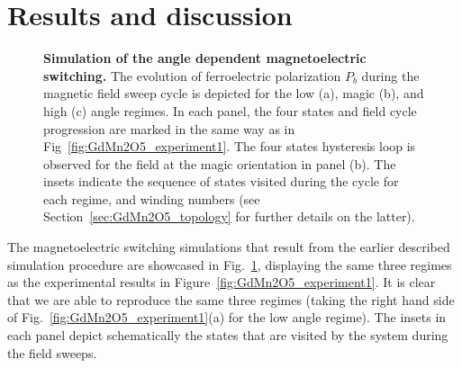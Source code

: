 \section{Results and discussion \label{sec:GdMn2O5_results_discussion}}
\begin{figure}
    \caption{\label{fig:GdMn2O5_theory}{\bf Simulation of the angle dependent magnetoelectric switching.}
    The evolution of ferroelectric polarization $P_b$ during the magnetic field sweep cycle is depicted for the low (a), magic (b), and high (c) angle regimes. 
   In each panel, the four states and field cycle progression are marked in the same way as in Fig~\ref{fig:GdMn2O5_experiment1}. The four states hysteresis loop is observed for the field at the magic orientation in panel (b). 
    The insets indicate the sequence of states visited during the cycle for each regime, and winding numbers (see Section~\ref{sec:GdMn2O5_topology} for further details on the latter).
}
\end{figure}
The magnetoelectric switching simulations that result from the earlier described simulation procedure are showcased in Fig.~\ref{fig:GdMn2O5_theory}, displaying the same three regimes as the experimental results in Figure~\ref{fig:GdMn2O5_experiment1}.
It is clear that we are able to reproduce the same three regimes (taking the right hand side of Fig.~\ref{fig:GdMn2O5_experiment1}(a) for the low angle regime).
The insets in each panel depict schematically the states that are visited by the system during the field sweeps.

